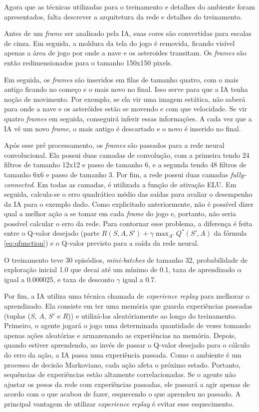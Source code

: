 Agora que as técnicas utilizadas para o treinamento e detalhes do ambiente foram apresentados, falta descrever a arquitetura da rede e detalhes do treinamento.

Antes de um \textit{frame} ser analisado pela IA, suas cores são convertidas para escalas de cinza.
Em seguida, a moldura da tela do jogo é removida, ficando visível apenas a área de jogo por onde a nave e os asteroides transitam.
Os \textit{frames} são então redimensionados para o tamanho 150x150 pixels.

Em seguida, os \textit{frames} são inseridos em filas de tamanho quatro, com o mais antigo ficando no começo e o mais novo no final. Isso serve para que a IA tenha noção de movimento.
Por exemplo, se ela vir uma imagem estática, não saberá para onde a nave e os asteróides estão se movendo e com que velocidade.
Se vir quatro \textit{frames} em seguida, conseguirá inferir essas informações.
A cada vez que a IA vê um novo \textit{frame}, o mais antigo é descartado e o novo é inserido no final.

Após esse pré processamento, os \textit{frames} são passados para a rede neural convolucional. Ela possui duas camadas de convolução, com a primeira tendo 24 filtros de tamanho 12x12 e passo de tamanho 6, e a segunda tendo 48 filtros de tamanho 6x6 e passo de tamanho 3.
Por fim, a rede possui duas camadas \textit{fully-connected}.
Em todas as camadas, é utilizada a função de ativação ELU.
Em seguida, calcula-se o erro quadrático médio das saídas para avaliar o desempenho da IA para o exemplo dado.
Como explicitado anteriormente, não é possível dizer qual a melhor ação a se tomar em cada \textit{frame} do jogo e, portanto, não seria possível calcular o erro da rede.
Para contornar esse problema, a diferença é feita entre o Q-valor desejado (parte $R(S,A,S') + \gamma\max_{A'}Q^{*}(S',A)$ da fórmula \ref{eq:qfunction}) e o Q-valor previsto para a saída da rede neural.

O treinamento teve 30 episódios, \textit{mini-batches} de tamanho 32, probabilidade de exploração inicial 1.0 que decai até um mínimo de 0.1, taxa de aprendizado $\alpha$ igual a 0.000025, e taxa de desconto $\gamma$ igual a 0.7.

Por fim, a IA utiliza uma técnica chamada de \textit{experience replay} para melhorar o aprendizado. Ela consiste em ter uma memória que guarda experiências passadas (tuplas ($S$, $A$, $S'$ e $R$)) e utilizá-las aleatóriamente ao longo do treinamento.
Primeiro, o agente jogará o jogo uma determinada quantidade de vezes tomando apenas ações aleatórias e armazenando as experiências na memória.
Depois, quando estiver aprendendo, ao invés de passar o Q-valor desejado para o cálculo do erro da ação, a IA passa uma experiência passada.
Como o ambiente é um processo de decisão Markoviano, cada ação afeta o próximo estado. Portanto, sequências de experiências estão altamente correlacionadas. Se o agente não ajustar os pesos da rede com experiências passadas, ele passará a agir apenas de acordo com o que acabou de fazer, esquecendo o que aprendeu no passado.
A principal vantagem de utilizar \textit{experience replay} é evitar esse esquecimento.

